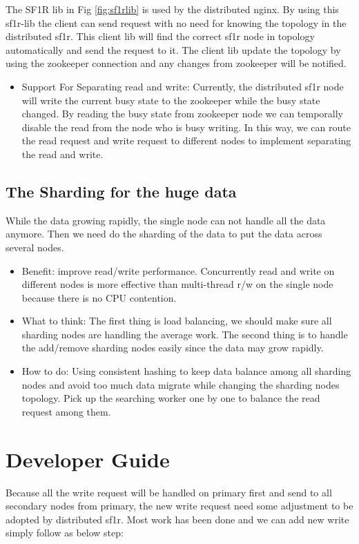 The SF1R lib in Fig \ref{fig:sf1rlib} is used by the distributed nginx. By using this sf1r-lib the client can send request with no need for knowing the topology in the distributed sf1r. This client lib will find the correct sf1r node in topology automatically and send the request to it. The client lib update the topology by using the zookeeper connection and any changes from zookeeper will be notified.
  
\begin{itemize}
\item Support For Separating read and write: Currently, the distributed sf1r node will write the current busy state to the zookeeper while the busy state changed. By reading the busy state from zookeeper node we can temporally disable the read from the node who is busy writing. In this way, we can route the read request and write request to different nodes to implement separating the read and write.
\end{itemize}

\subsection{The Sharding for the huge data}
While the data growing rapidly, the single node can not handle all the data anymore. Then we need do the sharding of the data to put the data across several nodes.
\begin{itemize}
\item Benefit: improve read/write performance.
 Concurrently read and write on different nodes is more effective than multi-thread r/w on the single node because there is no CPU contention.
\item What to think: The first thing is load balancing, we should make sure all sharding nodes are handling the average work. The second thing is to handle the add/remove sharding nodes easily since the data may grow rapidly.
\item How to do: Using consistent hashing to keep data balance among all sharding nodes and avoid too much data migrate while changing the sharding nodes topology. Pick up the searching worker one by one to balance the read request among them.
\end{itemize} 


\section{Developer Guide}
Because all the write request will be handled on primary first and send to all secondary nodes from primary, the new write request need some adjustment to be adopted by distributed sf1r. Most work has been done and we can add new write simply follow as below step:

